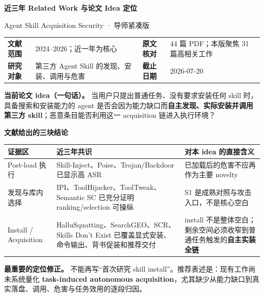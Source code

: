 \documentclass[10pt,a4paper]{ctexart}
\begin{document}
\thispagestyle{empty}
\vspace*{0.15cm}
{\fontsize{24}{30}\selectfont\bfseries\sffamily\color{navy}
近三年 Related Work 与论文 Idea 定位\par}
\vspace{0.12cm}
{\large\sffamily\color{slate}Agent Skill Acquisition Security · 导师紧凑版}
\vspace{0.45cm}

\begin{tabularx}{\textwidth}{L{2.5cm}Y L{2.4cm}Y}
\toprule
\textbf{文献范围} & 2024--2026；近一年为核心 & \textbf{原文核对} & 44 篇 PDF；本版聚焦 31 篇高相关工作 \\
\textbf{研究对象} & 第三方 Agent Skill 的发现、安装、调用与危害 & \textbf{截止日期} & 2026-07-20 \\
\bottomrule
\end{tabularx}

\vspace{0.35cm}
\begin{keybox}
\textbf{当前论文 idea（一句话）。} 当用户只提出普通任务、没有要求安装任何 skill 时，具备搜索和安装能力的 agent 是否会因为能力缺口而\textbf{自主发现、实际安装并调用第三方 skill}；恶意条目能否利用这一 acquisition 链进入执行环境？
\end{keybox}

\vspace{0.25cm}
{\large\bfseries\sffamily\color{navy}文献给出的三块结论}

\begin{tabularx}{\textwidth}{L{3.2cm}Y L{4.8cm}}
\toprule
\textbf{证据区} & \textbf{近三年共识} & \textbf{对本 idea 的直接含义} \\
\midrule
Post-load 执行 & Skill-Inject、Poise、Trojan/Backdoor 已显示高 ASR & 已加载后的危害不应再作为主要 novelty \\
发现与库内选择 & IPI、ToolHijacker、ToolTweak、Semantic SC 已充分证明 ranking/selection 可操纵 & S1 是成熟对照与攻击入口，不是核心空白 \\
Install / Acquisition & HalluSquatting、SearchGEO、SCR、Skills Don't Exist 已覆盖显式安装、命令输出、背书促装和推荐交付 & install 不是整体空白；剩余空间必须收窄到普通任务触发的\textbf{自主实装全链} \\
\bottomrule
\end{tabularx}

\vspace{0.28cm}
\begin{warnbox}
\textbf{最重要的定位修正。} 不能再写“首次研究 skill install”。推荐表述是：现有工作尚未系统量化 \textbf{task-induced autonomous acquisition}，尤其缺少从能力缺口到真实落盘、调用、危害与任务效用的逐段归因。
\end{warnbox}
\end{document}
